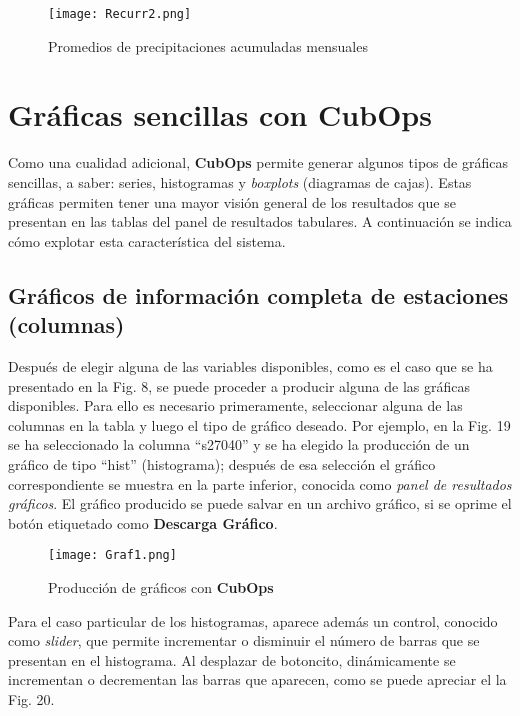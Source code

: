 \documentclass[spanish,]{article}
\begin{document}
\begin{figure}
\centering
\texttt{[image: Recurr2.png]}
\caption{Promedios de precipitaciones acumuladas mensuales}
\end{figure}

\section{Gráficas sencillas con
CubOps}\label{graficas-sencillas-con-cubops}

Como una cualidad adicional, \textbf{CubOps} permite generar algunos
tipos de gráficas sencillas, a saber: series, histogramas y
\emph{boxplots} (diagramas de cajas). Estas gráficas permiten tener una
mayor visión general de los resultados que se presentan en las tablas
del panel de resultados tabulares. A continuación se indica cómo
explotar esta característica del sistema.

\subsection{Gráficos de información completa de estaciones
(columnas)}\label{graficos-de-informacion-completa-de-estaciones-columnas}

Después de elegir alguna de las variables disponibles, como es el caso
que se ha presentado en la Fig. 8, se puede proceder a producir alguna
de las gráficas disponibles. Para ello es necesario primeramente,
seleccionar alguna de las columnas en la tabla y luego el tipo de
gráfico deseado. Por ejemplo, en la Fig. 19 se ha seleccionado la
columna ``s27040'' y se ha elegido la producción de un gráfico de tipo
``hist'' (histograma); después de esa selección el gráfico
correspondiente se muestra en la parte inferior, conocida como
\emph{panel de resultados gráficos}. El gráfico producido se puede
salvar en un archivo gráfico, si se oprime el botón etiquetado como
\textbf{Descarga Gráfico}.

\begin{figure}
\centering
\texttt{[image: Graf1.png]}
\caption{Producción de gráficos con \textbf{CubOps}}
\end{figure}

Para el caso particular de los histogramas, aparece además un control,
conocido como \emph{slider}, que permite incrementar o disminuir el
número de barras que se presentan en el histograma. Al desplazar de
botoncito, dinámicamente se incrementan o decrementan las barras que
aparecen, como se puede apreciar el la Fig. 20.
\end{document}
